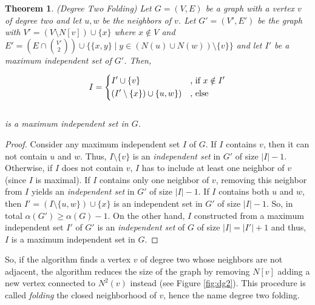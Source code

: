 \documentclass[12pt,a4paper,twoside]{scrartcl}
\newtheorem{theorem}{Theorem}
\numberwithin{equation}{section}
\begin{document}
\begin{theorem} (Degree Two Folding) Let $G=(V,E)$ be a graph with a vertex $v$ of degree two and let $u,w$ be the neighbors of $v$. Let $G'=(V',E')$ be the graph with $V'=(V\setminus N[v])\cup \{x\}$ where $x\notin V$ and $E'=(E\cap \binom{V'}{2})\cup\{ \{x,y\}\;|\;y\in(N(u)\cup N(w))\setminus\{v\} \}$ and let $I'$ be a maximum independent set of $G'$. Then,
	
	\[I=\begin{dcases}
	I'\cup \{v\} & \text{, if }x\notin I'\\
	(I'\setminus\{x\})\cup \{u,w\}) & \text{, else}%
	\end{dcases}\]\\
	is a maximum independent set in $G$.
\end{theorem}
\begin{proof}
	Consider any maximum independent set $I$ of $G$. If $I$ contains $v$, then it can not contain $u$ and $w$. Thus, $I\setminus\{v\}$ is an \textit{independent set} in $G'$ of size $|I| - 1$. Otherwise, if $I$ does not contain $v$, $I$ has to include at least one neighbor of $v$ (since $I$ is maximal). If $I$ contains only one neighbor of $v$, removing this neighbor from $I$ yields an \textit{independent set} in $G'$ of size $|I|-1$. If $I$ contains both $u$ and $w$, then $I'=(I\setminus\{u,w\})\cup\{x\}$ is an independent set in $G'$ of size $|I|-1$. So, in total $\alpha(G')\geq \alpha(G) -1$. On the other hand, $I$ constructed from a maximum independent set $I'$ of $G'$ is an \textit{independent set} of $G$ of size $|I| = |I'|+1$ and thus, $I$ is a maximum independent set in $G$.
\end{proof}

So, if the algorithm finds a vertex $v$ of degree two whose neighbors are not adjacent, the algorithm reduces the size of the graph by removing $N[v]$ adding a new vertex connected to $N^2(v)$ instead (see Figure \ref{fig:dg2}). This procedure is called \emph{folding} the closed neighborhood of $v$, hence the name degree two folding.\\
\end{document}
